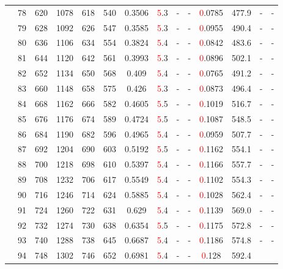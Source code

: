 \begin{table}[htb]
{\begin{tabular}{|c|c|c|c|c|c|c|c|c|c|c|c|c|c|}
 & 
78 & 620 & 1078 & 618 & 540
 & 0.3506 & \textcolor{red}5.3
 & - & -
 & \textcolor{red}0.0785 & 477.9
 & - & -
 \\
 & 
79 & 628 & 1092 & 626 & 547
 & 0.3585 & \textcolor{red}5.3
 & - & -
 & \textcolor{red}0.0955 & 490.4
 & - & -
 \\
 & 
80 & 636 & 1106 & 634 & 554
 & 0.3824 & \textcolor{red}5.4
 & - & -
 & \textcolor{red}0.0842 & 483.6
 & - & -
 \\
 & 
81 & 644 & 1120 & 642 & 561
 & 0.3993 & \textcolor{red}5.3
 & - & -
 & \textcolor{red}0.0896 & 502.1
 & - & -
 \\
 & 
82 & 652 & 1134 & 650 & 568
 & 0.409 & \textcolor{red}5.4
 & - & -
 & \textcolor{red}0.0765 & 491.2
 & - & -
 \\
 & 
83 & 660 & 1148 & 658 & 575
 & 0.426 & \textcolor{red}5.3
 & - & -
 & \textcolor{red}0.0873 & 496.4
 & - & -
 \\
 & 
84 & 668 & 1162 & 666 & 582
 & 0.4605 & \textcolor{red}5.5
 & - & -
 & \textcolor{red}0.1019 & 516.7
 & - & -
 \\
 & 
85 & 676 & 1176 & 674 & 589
 & 0.4724 & \textcolor{red}5.5
 & - & -
 & \textcolor{red}0.1087 & 548.5
 & - & -
 \\
 & 
86 & 684 & 1190 & 682 & 596
 & 0.4965 & \textcolor{red}5.4
 & - & -
 & \textcolor{red}0.0959 & 507.7
 & - & -
 \\
 & 
87 & 692 & 1204 & 690 & 603
 & 0.5192 & \textcolor{red}5.5
 & - & -
 & \textcolor{red}0.1162 & 554.1
 & - & -
 \\
 & 
88 & 700 & 1218 & 698 & 610
 & 0.5397 & \textcolor{red}5.4
 & - & -
 & \textcolor{red}0.1166 & 557.7
 & - & -
 \\
 & 
89 & 708 & 1232 & 706 & 617
 & 0.5549 & \textcolor{red}5.4
 & - & -
 & \textcolor{red}0.1102 & 554.3
 & - & -
 \\
 & 
90 & 716 & 1246 & 714 & 624
 & 0.5885 & \textcolor{red}5.4
 & - & -
 & \textcolor{red}0.1028 & 562.4
 & - & -
 \\
 & 
91 & 724 & 1260 & 722 & 631
 & 0.629 & \textcolor{red}5.4
 & - & -
 & \textcolor{red}0.1139 & 569.0
 & - & -
 \\
 & 
92 & 732 & 1274 & 730 & 638
 & 0.6354 & \textcolor{red}5.5
 & - & -
 & \textcolor{red}0.1175 & 572.8
 & - & -
 \\
 & 
93 & 740 & 1288 & 738 & 645
 & 0.6687 & \textcolor{red}5.4
 & - & -
 & \textcolor{red}0.1186 & 574.8
 & - & -
 \\
 & 
94 & 748 & 1302 & 746 & 652
 & 0.6981 & \textcolor{red}5.4
 & - & -
 & \textcolor{red}0.128 & 592.4

\end{tabular}}
\end{table}
